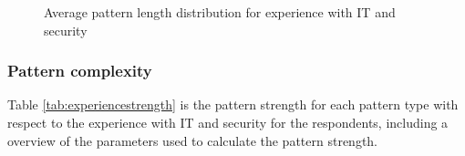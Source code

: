       \begin{figure}[H]
        \centering
        \caption{Average pattern length distribution for experience with IT and security}
        \label{fig:avgpatterndistexperience}
      \end{figure}

    \subsubsection{Pattern complexity}

      Table \ref{tab:experiencestrength} is the pattern strength for each pattern type with respect to the experience with IT and security for the respondents, including a overview of the parameters used to calculate the pattern strength. 





